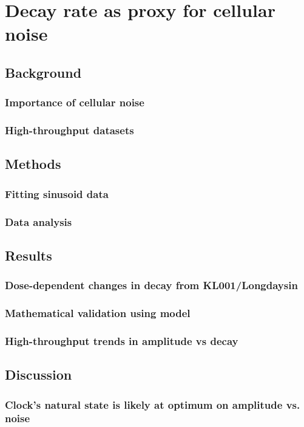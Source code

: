 \chapter{Decay rate as proxy for cellular noise}
\section{Background}
\subsection{Importance of cellular noise}
\subsection{High-throughput datasets}
\section{Methods}
\subsection{Fitting sinusoid data}
\subsection{Data analysis}
\section{Results}
\subsection{Dose-dependent changes in decay from KL001/Longdaysin}
\subsection{Mathematical validation using model}
\subsection{High-throughput trends in amplitude vs decay}
\section{Discussion}
\subsection{Clock's natural state is likely at optimum on amplitude vs. noise}
